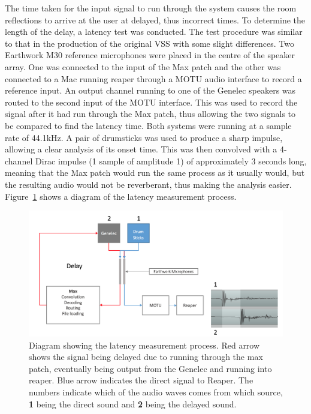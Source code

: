\documentclass[../../main.tex]{subfiles}
\begin{document}
		The time taken for the input signal to run through the system causes the room reflections to arrive at the user at delayed, thus incorrect times. To determine the length of the delay, a latency test was conducted. The test procedure was similar to that in the production of the original \ac{VSS} \cite{Brereton2014} with some slight differences. Two Earthwork M30 reference microphones \cite{earthworks} were placed in the centre of the speaker array. One was connected to the input of the Max patch and the other was connected to a Mac running reaper through a MOTU audio interface \cite{motu} to record a reference input. An output channel running to one of the Genelec speakers was routed to the second input of the MOTU interface. This was used to record the signal after it had run through the Max patch, thus allowing the two signals to be compared to find the latency time. Both systems were running at a sample rate of 44.1kHz. A pair of drumsticks was used to produce a sharp impulse, allowing a clear analysis of its onset time. This was then convolved with a 4-channel Dirac impulse (1 sample of amplitude 1) of approximately 3 seconds long, meaning that the Max patch would run the same process as it usually would, but the resulting audio would not be reverberant, thus making the analysis easier. Figure~\ref{latencyDiagram} shows a diagram of the latency measurement process.

		\begin{figure}
			\centerline{\includegraphics[scale = 0.4]{Sections/Implementation/Max/images/Latency/latencyDiagram.png}}
			\caption{Diagram showing the latency measurement process. Red arrow shows the signal being delayed due to running through the max patch, eventually being output from the Genelec and running into reaper. Blue arrow indicates the direct signal to Reaper. The numbers indicate which of the audio waves comes from which source, \textbf{1} being the direct sound and \textbf{2} being the delayed sound.}
			\label{latencyDiagram}
		\end{figure}
\end{document}
